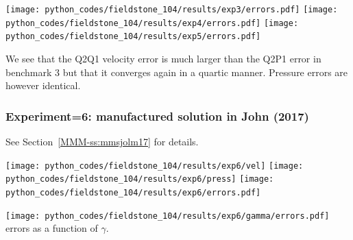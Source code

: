 \begin{center}
\texttt{[image: python\_codes/fieldstone\_104/results/exp3/errors.pdf]}
\texttt{[image: python\_codes/fieldstone\_104/results/exp4/errors.pdf]}
\texttt{[image: python\_codes/fieldstone\_104/results/exp5/errors.pdf]}
\end{center}

We see that the Q2Q1 velocity error is much larger than the Q2P1 error in benchmark 3 
but that it converges again in a quartic manner.
Pressure errors are however identical.

\subsubsection*{Experiment=6: manufactured solution in John \etal (2017) \cite{jolm17}}

See Section~\ref{MMM-ss:mmsjolm17} for details.

\begin{center}
\texttt{[image: python\_codes/fieldstone\_104/results/exp6/vel]}
\texttt{[image: python\_codes/fieldstone\_104/results/exp6/press]}
\texttt{[image: python\_codes/fieldstone\_104/results/exp6/errors.pdf]}
\end{center}


\begin{center}
\texttt{[image: python\_codes/fieldstone\_104/results/exp6/gamma/errors.pdf]}\\
{\captionfont errors as a function of $\gamma$.}
\end{center}



